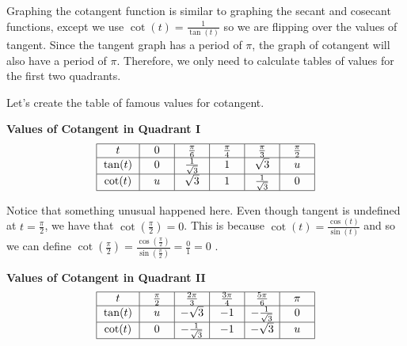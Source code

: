 \documentclass[nooutcomes, noauthor]{ximera}
\begin{document}
Graphing the cotangent function is similar to graphing the secant and cosecant functions, except we use $\cot(t)=\frac{1}{\tan(t)}$ so we are flipping over the values of tangent.  Since the tangent graph has a period of $\pi$, the graph of cotangent will also have a period of $\pi$.  Therefore, we only need to calculate tables of values for the first two quadrants.

Let's create the table of famous values for cotangent.

\begin{center}
\textbf{Values of Cotangent in Quadrant I}
\renewcommand*{\arraystretch}{2.5}
\setlength{\arrayrulewidth}{0.5mm}
\setlength{\tabcolsep}{18pt}
\[
\begin{array}{|>{\centering\arraybackslash$} p{1cm} <{$} | >{\centering\arraybackslash$} p{.75cm} <{$} |  >{\centering\arraybackslash$} p{.75cm} <{$} |  >{\centering\arraybackslash$} p{.75cm} <{$} |  >{\centering\arraybackslash$} p{.75cm} <{$} |  >{\centering\arraybackslash$} p{.75cm} <{$} |}
\hline 
t & 0 & \frac{\pi}{6} & \frac{\pi}{4} & \frac{\pi}{3} & \frac{\pi}{2}\\
\hline
\tan(t) & 0 & \frac{1}{\sqrt{3}} &1 & \sqrt{3} & u\\
\hline
\cot(t) & u & \sqrt{3} & 1 & \frac{1}{\sqrt{3}}& 0\\
\hline 
\end{array}
\]
\end{center}

Notice that something unusual happened here.  Even though tangent is undefined at $t=\frac{\pi}{2}$, we have that $\cot\left(\frac{\pi}{2}\right)=0$.  This is because $\cot(t)=\frac{\cos(t)}{\sin(t)}$ and so we can define $\cot\left(\frac{\pi}{2}\right)=\frac{\cos\left(\frac{\pi}{2}\right)}{\sin\left(\frac{\pi}{2}\right)}=\frac{0}{1}=0$ .

\begin{center}
\textbf{Values of Cotangent in Quadrant II}
\renewcommand*{\arraystretch}{2.5}
\setlength{\arrayrulewidth}{0.5mm}
\setlength{\tabcolsep}{18pt}
\[
\begin{array}{|>{\centering\arraybackslash$} p{1cm} <{$} | >{\centering\arraybackslash$} p{.75cm} <{$} |  >{\centering\arraybackslash$} p{.75cm} <{$} |  >{\centering\arraybackslash$} p{.75cm} <{$} |  >{\centering\arraybackslash$} p{.75cm} <{$} |  >{\centering\arraybackslash$} p{.75cm} <{$} |}
\hline 
t & \frac{\pi}{2} & \frac{2\pi}{3} & \frac{3\pi}{4} & \frac{5\pi}{6} & \pi\\
\hline
\tan(t) & u & -\sqrt{3} & -1 & -\frac{1}{\sqrt{3}} & 0\\
\hline
\cot(t) & 0 & -\frac{1}{\sqrt{3}}& -1 & -\sqrt{3} & u\\
\hline 
\end{array}
\]
\end{center}
\end{document}
